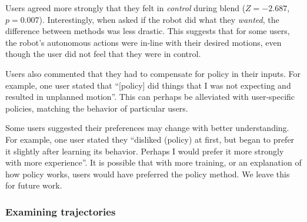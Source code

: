 
Users agreed more strongly that they felt in \emph{control} during blend ($Z = -2.687$, $p = 0.007$). Interestingly, when asked if the robot did what they \emph{wanted}, the difference between methods was less drastic. This suggests that for some users, the robot's autonomous actions were in-line with their desired motions, even though the user did not feel that they were in control.

Users also commented that they had to compensate for policy in their inputs. For example, one user stated that ``[policy] did things that I was not expecting and resulted in unplanned motion''. This can perhaps be alleviated with user-specific policies, matching the behavior of particular users.



Some users suggested their preferences may change with better understanding. For example, one user stated they ``disliked (policy) at first, but began to prefer it slightly after learning its behavior. Perhaps I would prefer it more strongly with more experience''. It is possible that with more training, or an explanation of how policy works, users would have preferred the policy method. We leave this for future work.




\subsubsection{Examining trajectories}


